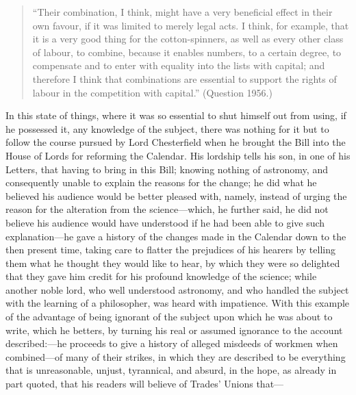 \begin{quote}
    \hspace{2em} ``Their combination, I think, might have a very
    beneficial effect in their own favour, if it was limited to merely
    legal acts. I think, for example, that it is a very good thing for
    the cotton-spinners, as well as every other class of labour, to
    combine, because it enables numbers, to a certain degree, to
    compensate and to enter with equality into the lists with capital;
    and therefore I think that combinations are essential to support the
    rights of labour in the competition with capital.'' (Question 1956.)
\end{quote}

In this state of things, where it was so essential to shut himself out
from using, if he possessed it, any knowledge of the subject, there was
nothing for it but to follow the course pursued by Lord Chesterfield
when he brought the Bill into the House of Lords for reforming the
Calendar. His lordship tells his son, in one of his Letters, that having
to bring in this Bill; knowing nothing of astronomy, and consequently
unable to explain the reasons for the change; he did what he believed
his audience would be better pleased with, namely, instead of urging the
reason for the alteration from the science---which, he further said, he
did not believe his audience would have understood if he had been able
to give such explanation---he gave a history of the changes made in the
Calendar down to the then present time, taking care to flatter the
prejudices of his hearers by telling them what he thought they would
like to hear, by which they were so delighted that they gave him credit
for his profound knowledge of the science; while another noble lord, who
well understood astronomy, and who handled the subject with the learning
of a philosopher, was heard with impatience. With this example of the
advantage of being ignorant of the subject upon which he was about to
write, which he betters, by turning his real or assumed ignorance to the
account described:---he proceeds to give a history of alleged misdeeds
of workmen when combined---of many of their strikes, in which they are
described to be everything that is unreasonable, unjust, tyrannical, and
absurd, in the hope, as already in part quoted, that his readers will
believe of Trades' Unions that---

